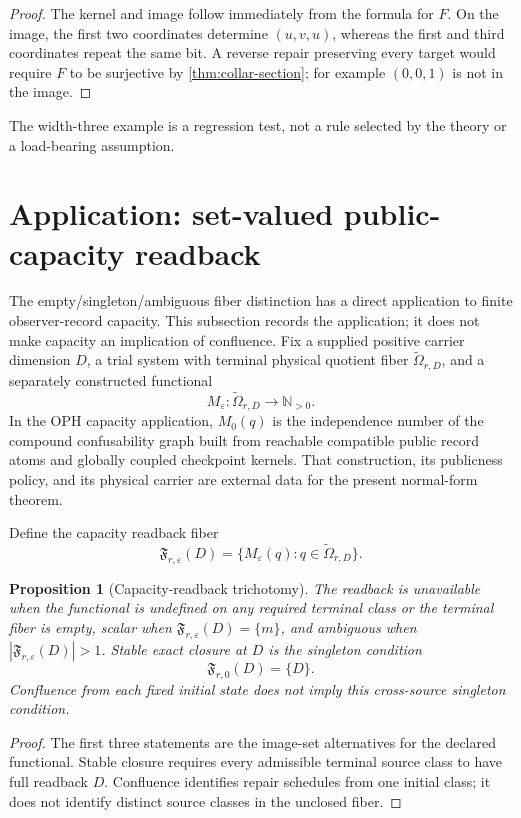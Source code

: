\documentclass[11pt]{article}
\newtheorem{proposition}[theorem]{Proposition}
\theoremstyle{definition}
\theoremstyle{remark}
\numberwithin{equation}{section}
\begin{document}
\begin{proof}
The kernel and image follow immediately from the formula for $F$.  On the image, the first two coordinates determine $(u,v,u)$, whereas the first and third coordinates repeat the same bit.  A reverse repair preserving every target would require $F$ to be surjective by \cref{thm:collar-section}; for example $(0,0,1)$ is not in the image.
\end{proof}

The width-three example is a regression test, not a rule selected by the
theory or a load-bearing assumption.

\section{Application: set-valued public-capacity readback}
\label{sec:public-capacity-application}

The empty/singleton/ambiguous fiber distinction has a direct application to
finite observer-record capacity. This subsection records the application; it
does not make capacity an implication of confluence. Fix a supplied positive
carrier dimension \(D\), a trial system with terminal physical quotient fiber
\(\widetilde\Omega_{r,D}\), and a separately constructed functional
\[
M_\varepsilon:\widetilde\Omega_{r,D}\longrightarrow\mathbb N_{>0}.
\]
In the OPH capacity application, \(M_0(q)\) is the independence number of the
compound confusability graph built from reachable compatible public record
atoms and globally coupled checkpoint kernels. That construction, its
publicness policy, and its physical carrier are external data for the present
normal-form theorem.

Define the capacity readback fiber
\[
\mathfrak F_{r,\varepsilon}(D)=
\{M_\varepsilon(q):q\in\widetilde\Omega_{r,D}\}.
\]

\begin{proposition}[Capacity-readback trichotomy]
\label{prop:capacity-readback-trichotomy}
The readback is unavailable when the functional is undefined on any required
terminal class or the terminal fiber is empty, scalar when
\(\mathfrak F_{r,\varepsilon}(D)=\{m\}\), and ambiguous when
\(|\mathfrak F_{r,\varepsilon}(D)|>1\). Stable exact closure at \(D\) is the
singleton condition
\[
\mathfrak F_{r,0}(D)=\{D\}.
\]
Confluence from each fixed initial state does not imply this cross-source
singleton condition.
\end{proposition}

\begin{proof}
The first three statements are the image-set alternatives for the declared
functional. Stable closure requires every admissible terminal source class to
have full readback \(D\). Confluence identifies repair schedules from one
initial class; it does not identify distinct source classes in the unclosed
fiber.
\end{proof}
\end{document}
